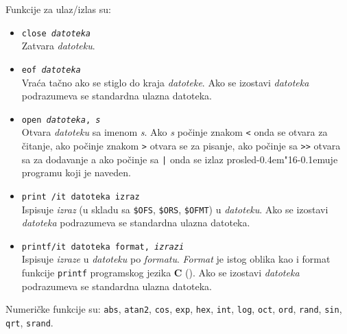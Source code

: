 \documentclass[12pt,a4paper]{article}
\def\d{d\kern-0.4em\char"16\kern-0.1em}
\begin{document}
        Funkcije za ulaz/izlas su:
        \begin{itemize}
        \item
          {\tt close {\it datoteka}}\\
          Zatvara {\it datoteku}.
        \item
          {\tt eof {\it datoteka}}\\
          Vra\'ca ta\v cno ako se stiglo do kraja {\it datoteke}.
          Ako se izostavi {\it datoteka} podrazumeva se standardna ulazna
          datoteka.
        \item
          {\tt open {\it datoteka}, {\it s}}\\
          Otvara {\it datoteku} sa imenom {\it s}.
          Ako {\it s} po\v cinje znakom {\tt<} onda se otvara za \v citanje,
          ako po\v cinje znakom {\tt>} otvara se za pisanje, ako po\v cinje sa
          {\tt>>} otvara sa za dodavanje a ako po\v cinje sa {\tt|} onda se
          izlaz prosle\d uje programu koji je naveden.
        \item
          {\tt print {/it datoteka izraz}}\\
          Ispisuje {\it izraz} (u skladu sa {\tt\$OFS}, {\tt\$ORS},
          {\tt\$OFMT}) u {\it datoteku}.
          Ako se izostavi {\it datoteka} podrazumeva se standardna ulazna
          datoteka.
        \item
          {\tt printf{/it datoteka format}, {\it izrazi}}\\
          Ispisuje {\it izraze} u {\it datoteku} po {\it formatu}.
          {\it Format} je istog oblika kao i format funkcije {\tt printf}
          programskog jezika {\bf C} (\cite{KR,PERL}).
          Ako se izostavi {\it datoteka} podrazumeva se standardna ulazna
          datoteka.
        \end{itemize}

        Numeri\v cke funkcije su: {\tt abs}, {\tt atan2}, {\tt cos},
        {\tt exp}, {\tt hex}, {\tt int}, {\tt log}, {\tt oct}, {\tt ord},
        {\tt rand}, {\tt sin}, {\tt qrt}, {\tt srand}.
\end{document}
